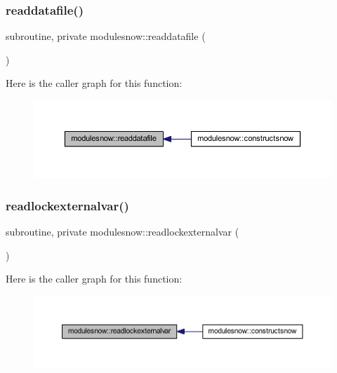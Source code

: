 \subsubsection{\texorpdfstring{readdatafile()}{readdatafile()}}
{\footnotesize\ttfamily subroutine, private modulesnow\+::readdatafile (\begin{DoxyParamCaption}{ }\end{DoxyParamCaption})\hspace{0.3cm}{\ttfamily [private]}}

Here is the caller graph for this function\+:\nopagebreak
\begin{figure}[H]
\begin{center}
\leavevmode
\includegraphics[width=350pt]{namespacemodulesnow_a6ca0e43e3af7be1542e8e61ec1d6d7b6_icgraph}
\end{center}
\end{figure}
\mbox{\label{namespacemodulesnow_ac0228c4a338498fe67a6c82ec745030c}} 
\subsubsection{\texorpdfstring{readlockexternalvar()}{readlockexternalvar()}}
{\footnotesize\ttfamily subroutine, private modulesnow\+::readlockexternalvar (\begin{DoxyParamCaption}{ }\end{DoxyParamCaption})\hspace{0.3cm}{\ttfamily [private]}}

Here is the caller graph for this function\+:\nopagebreak
\begin{figure}[H]
\begin{center}
\leavevmode
\includegraphics[width=350pt]{namespacemodulesnow_ac0228c4a338498fe67a6c82ec745030c_icgraph}
\end{center}
\end{figure}
\mbox{\label{namespacemodulesnow_af891ed4f018c66ced7868c95013229f2}} 
